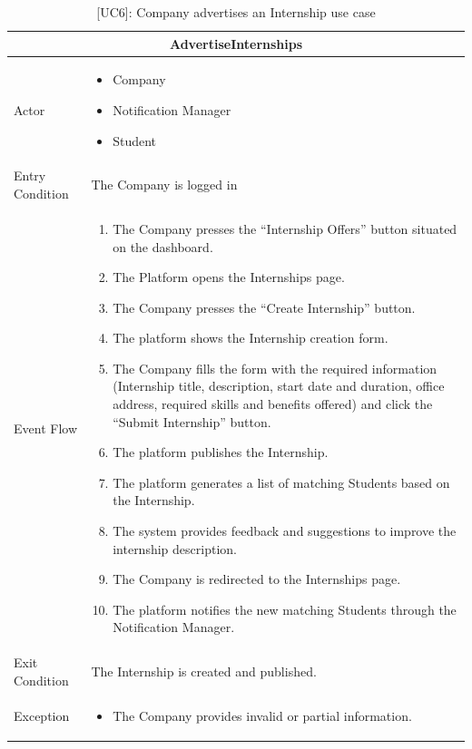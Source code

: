 \begin{table}[H]
    \centering
    \begin{tabular}{|p{3cm}|p{12cm}|}
    \hline
    \multicolumn{2}{|c|}{\textbf{AdvertiseInternships}} \\ \hline
    Actor & 
    \begin{itemize}
        \item Company
        \item Notification Manager
        \item Student
    \end{itemize}\\ \hline
    Entry Condition & The Company is logged in\\ \hline
    Event Flow &
    \begin{enumerate}         
        \item The Company presses the “Internship Offers” button situated on the dashboard.
        \item The Platform opens the Internships page.
        \item The Company presses the “Create Internship” button.
        \item The platform shows the Internship creation form.
        \item The Company fills the form with the required information (Internship title, description, start date and duration, office address, required skills and benefits offered) and click the “Submit Internship” button.
        \item The platform publishes the Internship.
        \item The platform generates a list of matching Students based on the Internship.
        \item The system provides feedback and suggestions to improve the internship description.
        \item The Company is redirected to the Internships page.
        \item The platform notifies the new matching Students through the Notification Manager. 
    \end{enumerate} \\ \hline
    Exit Condition & The Internship is created and published.\\ \hline
    Exception & 
    \begin{itemize}        
        \item The Company provides invalid or partial information.
    \end{itemize} \\ \hline
    \end{tabular}
    \caption{[UC6]: Company advertises an Internship use case}
    \label{tab:UC6}
\end{table}

